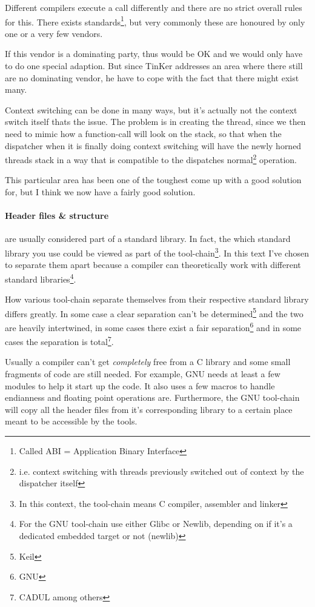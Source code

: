 Different compilers execute a call differently and there are no strict overall rules for this. There exists standards\footnote{Called ABI = Application Binary Interface}, but very commonly these are honoured by only one or a very few vendors.

If this vendor is a dominating party, thus would be OK and we would only have to do one special adaption. But since TinKer addresses an area where there still are no dominating vendor, he have to cope with the fact that there might exist many.

Context switching can be done in many ways, but it's actually not the context switch itself thats the issue. The problem is in creating the thread, since we then need to mimic how a function-call will look on the stack, so that when the dispatcher when it is finally doing context switching will have the newly horned threads stack in a way that is compatible to the dispatches normal\footnote{i.e. context switching with threads previously switched out of context by the dispatcher itself} operation.

This particular area has been one of the toughest come up with a good solution for, but I think we now have a fairly good solution.

\paragraph{Header files \& structure} are usually considered part of a standard library. In fact, the which standard library you use could be viewed as part of the tool-chain\footnote{In this context, the tool-chain means C compiler, assembler and linker}. In this text I've chosen to separate them apart because a compiler can theoretically work with different standard libraries\footnote{For the GNU tool-chain use either Glibc or Newlib, depending on if it's a dedicated embedded target or not (newlib)}.

How various tool-chain separate themselves from their respective standard library differs greatly. In some case a clear separation can't be determined\footnote{Keil} and the two are heavily intertwined, in some cases there exist a fair separation\footnote{GNU} and in some cases the separation is total\footnote{CADUL among others}.

Usually a compiler can't get \textit{completely} free from a C library and some small fragments of code are still needed. For example, GNU needs at least a few modules to help it start up the code. It also uses a few macros to handle endianness and floating point operations are. Furthermore, the GNU tool-chain will copy all the header files from it's corresponding library to a certain place meant to be accessible by the tools.

